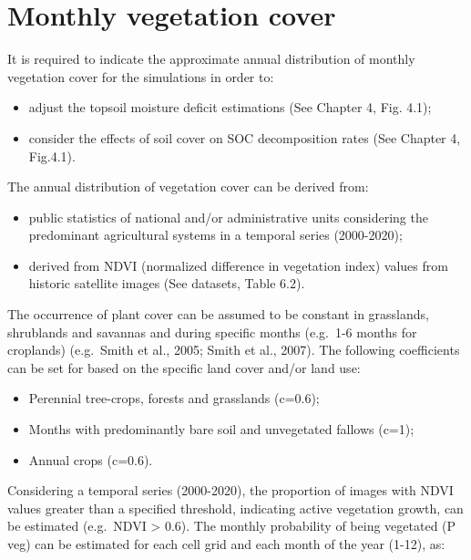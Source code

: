 \documentclass[
  10pt,
  b5paper,
]{book}
\providecommand{\tightlist}{%
  \setlength{\itemsep}{0pt}\setlength{\parskip}{0pt}}
\begin{document}
\hypertarget{monthly-vegetation-cover}{%
\section{Monthly vegetation cover}\label{monthly-vegetation-cover}}

It is required to indicate the approximate annual distribution of monthly vegetation cover for the simulations in order to:

\begin{itemize}
\tightlist
\item
  adjust the topsoil moisture deficit estimations (See Chapter 4, Fig. 4.1);
\item
  consider the effects of soil cover on SOC decomposition rates (See Chapter 4, Fig.4.1).
\end{itemize}

The annual distribution of vegetation cover can be derived from:

\begin{itemize}
\tightlist
\item
  public statistics of national and/or administrative units considering the predominant agricultural systems in a temporal series (2000-2020);
\item
  derived from NDVI (normalized difference in vegetation index) values from historic satellite images (See datasets, Table 6.2).
\end{itemize}

The occurrence of plant cover can be assumed to be constant in grasslands, shrublands and savannas and during specific months (e.g.~1-6 months for croplands) (e.g.~Smith et al., 2005; Smith et al., 2007). The following coefficients can be set for based on the specific land cover and/or land use:

\begin{itemize}
\tightlist
\item
  Perennial tree-crops, forests and grasslands (c=0.6);
\item
  Months with predominantly bare soil and unvegetated fallows (c=1);
\item
  Annual crops (c=0.6).
\end{itemize}

Considering a temporal series (2000-2020), the proportion of images with NDVI values greater than a specified threshold, indicating active vegetation growth, can be estimated (e.g.~NDVI \textgreater{} 0.6). The monthly probability of being vegetated (P veg) can be estimated for each cell grid and each month of the year (1-12), as:
\end{document}
